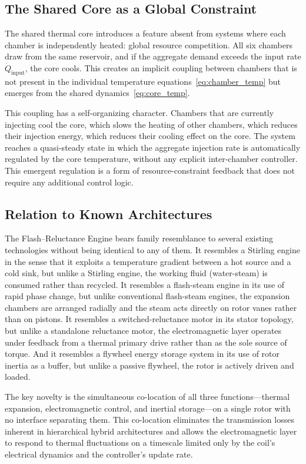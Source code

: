 \documentclass[11pt, a4paper]{article}
\theoremstyle{plain}
\theoremstyle{definition}
\begin{document}
\subsection{The Shared Core as a Global Constraint}

The shared thermal core introduces a feature absent from systems where each chamber is independently heated: global resource competition. All six chambers draw from the same reservoir, and if the aggregate demand exceeds the input rate $\dot{Q}_{\mathrm{input}}$, the core cools. This creates an implicit coupling between chambers that is not present in the individual temperature equations~\eqref{eq:chamber_temp} but emerges from the shared dynamics~\eqref{eq:core_temp}.

This coupling has a self-organizing character. Chambers that are currently injecting cool the core, which slows the heating of other chambers, which reduces their injection energy, which reduces their cooling effect on the core. The system reaches a quasi-steady state in which the aggregate injection rate is automatically regulated by the core temperature, without any explicit inter-chamber controller. This emergent regulation is a form of resource-constraint feedback that does not require any additional control logic.

\subsection{Relation to Known Architectures}

The Flash--Reluctance Engine bears family resemblance to several existing technologies without being identical to any of them. It resembles a Stirling engine in the sense that it exploits a temperature gradient between a hot source and a cold sink, but unlike a Stirling engine, the working fluid (water-steam) is consumed rather than recycled. It resembles a flash-steam engine in its use of rapid phase change, but unlike conventional flash-steam engines, the expansion chambers are arranged radially and the steam acts directly on rotor vanes rather than on pistons. It resembles a switched-reluctance motor in its stator topology, but unlike a standalone reluctance motor, the electromagnetic layer operates under feedback from a thermal primary drive rather than as the sole source of torque. And it resembles a flywheel energy storage system in its use of rotor inertia as a buffer, but unlike a passive flywheel, the rotor is actively driven and loaded.

The key novelty is the simultaneous co-location of all three functions---thermal expansion, electromagnetic control, and inertial storage---on a single rotor with no interface separating them. This co-location eliminates the transmission losses inherent in hierarchical hybrid architectures and allows the electromagnetic layer to respond to thermal fluctuations on a timescale limited only by the coil's electrical dynamics and the controller's update rate.
\end{document}
